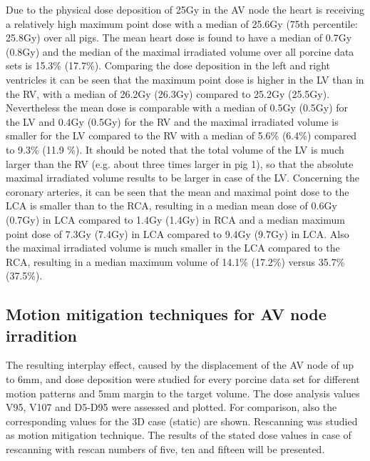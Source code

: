 Due to the physical dose deposition of 25Gy in the AV node the heart is receiving a relatively high maximum point dose with a median of 
25.6Gy (75th percentile: 25.8Gy) over all pigs. The mean heart dose is found to have a median of 0.7Gy (0.8Gy) and the median of the 
maximal irradiated volume over all porcine data sets is 15.3\% (17.7\%). Comparing the dose deposition in the left and right ventricles 
it can be seen that the maximum point dose is higher in the LV than in the RV, with a median of 26.2Gy (26.3Gy) compared to 25.2Gy (25.5Gy). 
Nevertheless the mean dose is comparable with a median of 0.5Gy (0.5Gy) for the LV and 0.4Gy (0.5Gy) for the RV and the maximal irradiated 
volume is smaller for the LV compared to the RV with a median of 5.6\% (6.4\%) compared to 9.3\% (11.9 \%). It should be noted that the total 
volume of the LV is much larger than the RV (e.g. about three times larger in pig 1), so that the absolute maximal irradiated volume 
results to be larger in case of the LV. Concerning the coronary arteries, 
it can be seen that the mean and maximal point dose to the LCA is smaller than to the RCA, resulting in a median mean dose of 0.6Gy (0.7Gy) 
in LCA compared to 1.4Gy (1.4Gy) in RCA and a median maximum point dose of 7.3Gy (7.4Gy) in LCA compared to 9.4Gy (9.7Gy) in LCA. 
Also the maximal irradiated volume is much smaller in the LCA compared to the RCA, resulting in a median maximum volume of 14.1\% (17.2\%) 
versus 35.7\% (37.5\%). 

\subsection{Motion mitigation techniques for AV node irradition}

The resulting interplay effect, caused by the displacement of the AV node of up to 6mm, and dose deposition were studied for every porcine 
data set for different motion patterns and 5mm margin to the target volume. The dose analysis values V95, V107 and D5-D95 were assessed and 
plotted. For comparison, also the corresponding values for the 3D case (static) are shown. Rescanning was studied as motion mitigation 
technique. The results of the stated dose values in case of rescanning with rescan numbers of five, ten and fifteen will be presented. 


